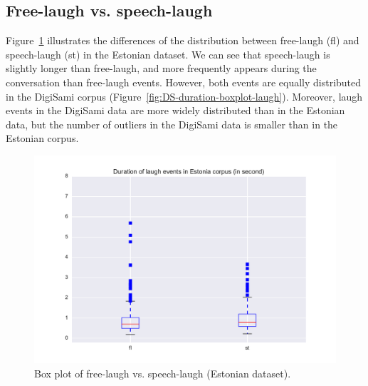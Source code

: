 \documentclass[10pt,journal,compsoc]{IEEEtran}
\begin{document}
\subsection{Free-laugh vs. speech-laugh}


Figure~\ref{fig:EE-duration-boxplot-laugh} illustrates the differences of the distribution between free-laugh (fl) and speech-laugh (st) in the Estonian dataset. We can see that speech-laugh is slightly longer than free-laugh, and more frequently appears during the conversation than free-laugh events.
However, both events are equally distributed in the DigiSami corpus (Figure~\ref{fig:DS-duration-boxplot-laugh}). Moreover, laugh events in the DigiSami data are more widely distributed than in the Estonian data, but the number of outliers in the DigiSami data is smaller than in the Estonian corpus.

\begin{figure}[!t]
\centering
\includegraphics[width=1\linewidth]{figures/estonia/duration_boxplot_laugh.pdf}
\caption{Box plot of free-laugh vs. speech-laugh (Estonian dataset).}
\label{fig:EE-duration-boxplot-laugh}
\end{figure}
\end{document}

